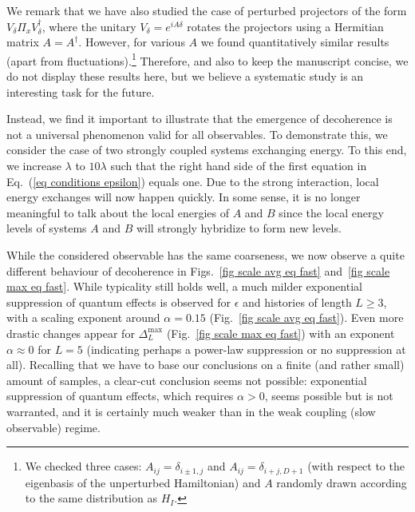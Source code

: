 \documentclass[pre,onecolumn,12pt,aps,longbibliography,nofootinbib]{revtex4-2}
\newcommand{\blue}[1]{#1}
\newcommand{\new}[1]{#1}
\begin{document}
\new{We remark that we have also studied the case of perturbed projectors of the form $V_\delta \Pi_x V_\delta^\dagger$, where the unitary $V_\delta = e^{iA\delta}$ rotates the projectors using a Hermitian matrix $A = A^\dagger$. However, for various $A$ we found quantitatively similar results (apart from fluctuations).\footnote{\new{We checked three cases: $A_{ij} = \delta_{i\pm1,j}$ and $A_{ij} = \delta_{i+j,D+1}$ (with respect to the eigenbasis of the unperturbed Hamiltonian) and $A$ randomly drawn according to the same distribution as $H_I$.}} Therefore, and also to keep the manuscript concise, we do not display these results here, but we believe a systematic study is an interesting task for the future.}

\new{Instead, we find it important to illustrate that} the emergence of \new{decoherence} is {not} a universal phenomenon valid for all observables. To demonstrate this, we consider the case of two strongly coupled systems exchanging energy. To this end, we increase $\lambda$ to $10\lambda$ such that the right hand side of the first equation in Eq.~(\ref{eq conditions epsilon}) equals one. Due to the strong interaction, local energy exchanges will now happen quickly. In some sense, it is no longer meaningful to talk about the local energies of $A$ and $B$ since the local energy levels of systems $A$ and $B$ will strongly hybridize to form new levels.

\blue{While the considered observable has the same coarseness, we now observe a quite} different behaviour of \new{decoherence} in Figs.~\ref{fig scale avg eq fast} and~\ref{fig scale max eq fast}. While typicality still holds well, \blue{a much milder exponential suppression of quantum effects is observed for $\epsilon$ and} histories of length $L\ge3$, \blue{with a} scaling exponent around $\alpha = 0.15$ (Fig.~\ref{fig scale avg eq fast}). \blue{Even more drastic changes appear for $\Delta_L^\text{max}$ (Fig.~\ref{fig scale max eq fast}) with an exponent $\alpha\approx 0$ for $L=5$ (indicating perhaps a power-law suppression or no suppression at all)}. Recalling that we have to base our conclusions on a finite (and rather small) amount of samples, a clear-cut conclusion seems not possible: exponential suppression of quantum effects, which requires $\alpha>0$, seems possible but is not warranted, and it is certainly much weaker than in the weak coupling (slow observable) regime.
\end{document}

